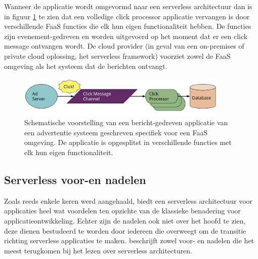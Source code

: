 Wanneer de applicatie wordt omgevormd naar een serverless architectuur dan is in figuur \ref{fig:faas-message-driven} te zien dat een volledige click processor applicatie vervangen is door verschillende FaaS functies die elk hun eigen functionaliteit hebben. De functies zijn evenement-gedreven en worden uitgevoerd op het moment dat er een click message ontvangen wordt. De cloud provider (in geval van een on-premises of private cloud oplossing, het serverless framework)  voorziet zowel de FaaS omgeving als het systeem dat de berichten ontvangt.
\begin{figure}
    \centering
    \includegraphics[width=0.9\textwidth]{img/faas_message_driven.png}
    \caption{Schematische voorstelling van een bericht-gedreven applicatie van een advertentie systeem geschreven specifiek voor een FaaS omgeving. De applicatie is opgesplitst in verschillende functies met elk hun eigen functionaliteit. \autocite{Roberts2018}} 
    \label{fig:faas-message-driven}  
\end{figure}

\subsection{Serverless voor-en nadelen}
Zoals reeds enkele keren werd aangehaald, biedt een serverless architectuur voor applicaties heel wat voordelen ten opzichte van de klassieke benadering voor applicatieontwikkeling. Echter zijn de nadelen ook niet over het hoofd te zien, deze dienen bestudeerd te worden door iedereen die overweegt om de transitie richting serverless applicaties te maken. \textcite{Stigler2017} beschrijft zowel voor- en nadelen die het meest terugkomen bij het lezen over serverless architecturen.

